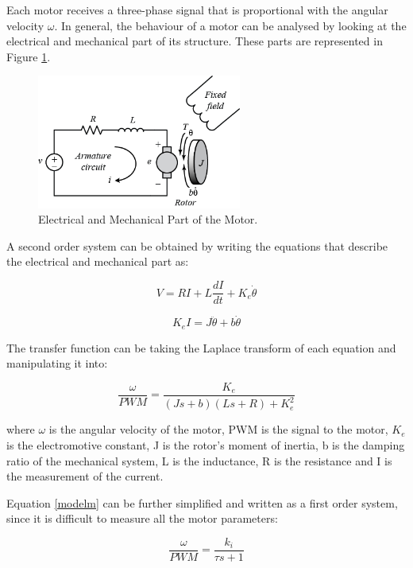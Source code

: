 Each motor receives a three-phase signal that is proportional with the angular velocity $\omega$. In general, the behaviour of a motor can be analysed by looking at the electrical and mechanical part of its structure. These parts are represented in Figure \ref{dc}. 

\begin{figure}[H]
  \centering
    \includegraphics[width=0.6\textwidth]{images/dc.png}
	\caption{Electrical and Mechanical Part of the Motor.\cite{MotorFig}}
	\label{dc}
\end{figure}

A second order system can be obtained by writing the equations that describe the electrical and mechanical part as:

\begin{equation}
	V=RI+L\frac{dI}{dt}+K_{e}\dot{\theta}
\end{equation}

\begin{equation}
   K_{e}I = J \ddot{\theta}+b\dot{\theta}
\end{equation}

The transfer function can be taking the Laplace transform of each equation and manipulating it into:

\begin{equation}
\label{modelm} 
   \frac{\omega}{PWM}=\frac{K_{e}}{(Js+b)(Ls+R)+K_{e}^{2}}
\end{equation}

where $\omega$ is the angular velocity of the motor, PWM is the signal to the motor, $K_{e}$ is the electromotive constant, J is the rotor's moment of inertia, b is the damping ratio of the mechanical system, L is the inductance, R is the resistance and I is the measurement of the current.

Equation \ref{modelm} can be further simplified and written as a first order system, since it is difficult to measure all the motor parameters:\cite{Report1}

\begin{equation}
   \frac{\omega}{PWM}=\frac{k_{i}}{\tau s+1}
\end{equation}

